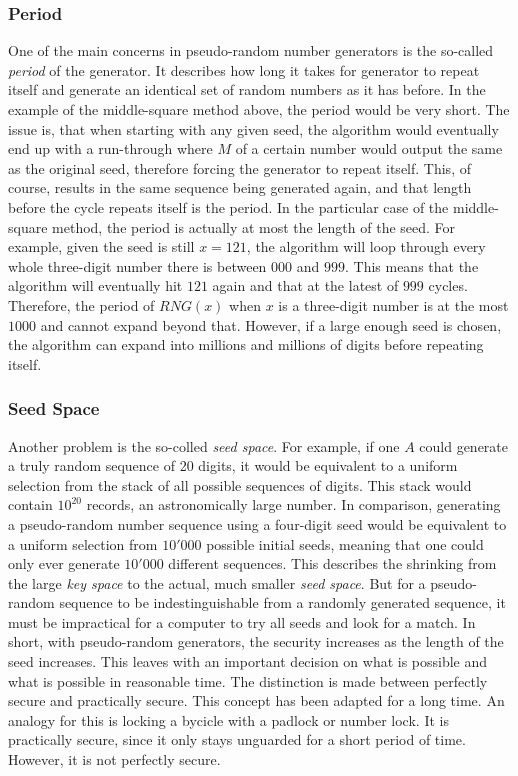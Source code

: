 \subsubsection{Period}
One of the main concerns in pseudo-random number generators is the so-called \emph{period} of the generator.
It describes how long it takes for generator to repeat itself and generate an identical set of random numbers as it has before.
\newline
In the example of the middle-square method above, the period would be very short.
The issue is, that when starting with any given seed, the algorithm would eventually end up with a run-through where $M$ of a certain number would output the same as the original seed, therefore forcing the generator to repeat itself.
This, of course, results in the same sequence being generated again, and that length before the cycle repeats itself is the period.
\emptyline
In the particular case of the middle-square method, the period is actually at most the length of the seed.
For example, given the seed is still $x = 121$, the algorithm will loop through every whole three-digit number there is between $000$ and $999$.
This means that the algorithm will eventually hit $121$ again and that at the latest of $999$ cycles. 
Therefore, the period of $RNG(x)$ when $x$ is a three-digit number is at the most $1000$ and cannot expand beyond that.
\newline
However, if a large enough seed is chosen, the algorithm can expand into millions and millions of digits before repeating itself.

\subsubsection{Seed Space}
Another problem is the so-colled \emph{seed space}.
For example, if one $A$ could generate a truly random sequence of 20 digits, it would be equivalent to a uniform selection from the stack of all possible sequences of digits.
This stack would contain $10^20$ records, an astronomically large number.
In comparison, generating a pseudo-random number sequence using a four-digit seed would be equivalent to a uniform selection from $10'000$ possible initial seeds, meaning that one could only ever generate $10'000$ different sequences.
This describes the shrinking from the large \emph{key space} to the actual, much smaller \emph{seed space}. 
But for a pseudo-random sequence to be indestinguishable from a randomly generated sequence, it must be impractical for a computer to try all seeds and look for a match.
In short, with pseudo-random generators, the security increases as the length of the seed increases. 
\newline
This leaves with an important decision on what is possible and what is possible in reasonable time. The distinction is made between perfectly secure and practically secure.
This concept has been adapted for a long time. An analogy for this is locking a bycicle with a padlock or number lock. It is practically secure, since it only stays unguarded for a short period of time. However, it is not perfectly secure.